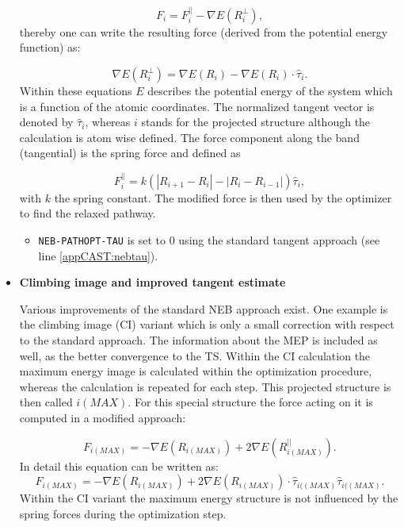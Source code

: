 \documentclass[a4paper,11pt]{scrartcl}
\begin{document}
\begin{itemize}
\begin{equation}
F_{i}=F^{||}_{i}-\nabla E(R^{\bot}_{i}),
\end{equation}
thereby one can write the resulting force (derived from the potential energy function) as:

\begin{equation}
\nabla E(R^{\bot}_{i})=\nabla E(R_{i}) -\nabla E(R_{i})\cdot \hat{\tau}_{i}.
\end{equation}
Within these equations $E$ describes the potential energy of the system which is a function of the atomic coordinates. The normalized tangent vector is denoted by $\hat{\tau}_{i}$, whereas $i$ stands for the projected structure although the calculation is atom wise defined. The force component along the band (tangential) is the spring force and defined as

\begin{equation}
F^{||}_{i}=k\left(\left|R_{i+1}-R_{i}\right|-\left|R_{i}-R_{i-1}\right|\right)\hat{\tau}_{i},
\end{equation}
with $k$ the spring constant. The modified force is then used by the optimizer to find the relaxed pathway. 

\begin{itemize}

\item \texttt{NEB-PATHOPT-TAU} is set to 0 using the standard tangent approach (see line \ref{appCAST:nebtau}).

\end{itemize}


\item \textbf{Climbing image and improved tangent estimate}

Various improvements of the standard NEB approach exist. One example is the climbing image (CI) variant which is only a small correction with respect to the standard approach. The information about the MEP is included as well, as the better convergence to the TS. Within the CI calculation the maximum energy image is calculated within the optimization procedure, whereas the calculation is repeated for each step. This projected structure is then called $i(MAX)$. For this special structure the force acting on it is computed in a modified approach:

\begin{equation}
F_{i(MAX)}=-\nabla E(R_{i(MAX)})+2 \nabla E(R^{||}_{i(MAX)}).
\end{equation}
In detail this equation can be written as:
\begin{equation}
F_{i(MAX)}=-\nabla E(R_{i(MAX)})+2\nabla E(R_{i(MAX)})\cdot \hat{\tau}_{i((MAX)}\hat{\tau}_{i((MAX)}.
\end{equation}
Within the CI variant the maximum energy structure is not influenced by the spring forces during the optimization step. 


\end{itemize}
\end{document}
